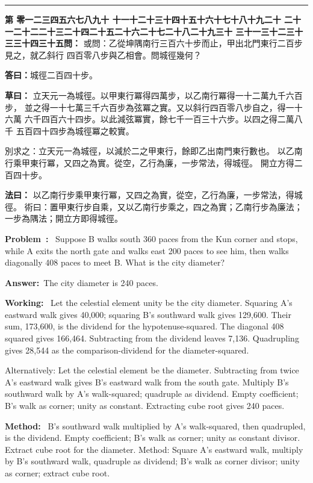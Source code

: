 \documentclass[9pt,a4paper]{article}
\newcounter{probnum}
\newcounter{overallnum}
\newcommand{\chnum}[1]{%
  \ifcase#1 零\or 一\or 二\or 三\or 四\or 五\or 六\or 七\or 八\or 九\or 十\or
    十一\or 十二\or 十三\or 十四\or 十五\or 十六\or 十七\or 十八\or 十九\or 二十\or
    二十一\or 二十二\or 二十三\or 二十四\or 二十五\or 二十六\or 二十七\or 二十八\or 二十九\or 三十\or
    三十一\or 三十二\or 三十三\or 三十四\or 三十五\fi}
\newcommand{\problem}[1]{\stepcounter{probnum}\stepcounter{overallnum}\par\noindent\textbf{\color{volcolor}第\chnum{\value{probnum}}問：}#1\par\vspace{0.15cm}}
\newcommand{\answer}[1]{\par\noindent\textbf{答曰：}#1\par\vspace{0.15cm}}
\newcommand{\working}[1]{\par\noindent\textbf{草曰：}#1\par\vspace{0.15cm}}
\newcommand{\method}[1]{\par\noindent\textbf{法曰：}#1\par\vspace{0.25cm}}
\newcommand{\eproblem}[1]{\par\noindent\textbf{\color{volcolor}Problem~\theoverallnum:}~#1\par\vspace{0.15cm}}
\newcommand{\eanswer}[1]{\par\noindent\textbf{Answer:}~#1\par\vspace{0.15cm}}
\newcommand{\eworking}[1]{\par\noindent\textbf{Working:}~#1\par\vspace{0.15cm}}
\newcommand{\emethod}[1]{\par\noindent\textbf{Method:}~#1\par\vspace{0.25cm}}
\begin{document}
\vspace{0.15cm}
\noindent\rule{\textwidth}{0.2pt}
\vspace{0.15cm}

\noindent\begin{minipage}[t]{0.48\textwidth}
\problem{
或問：乙從坤隅南行三百六十步而止，甲出北門東行二百步見之，就乙斜行
四百零八步與乙相會。問城徑幾何？
}

\answer{城徑二百四十步。}

\working{
立天元一為城徑。以甲東行冪得四萬步，以乙南行冪得一十二萬九千六百步，
並之得一十七萬三千六百步為弦冪之實。又以斜行四百零八步自之，得一十六萬
六千四百六十四步。以此減弦冪實，餘七千一百三十六步。以四之得二萬八千
五百四十四步為城徑冪之較實。

別求之：立天元一為城徑，以減於二之甲東行，餘即乙出南門東行數也。
以乙南行乘甲東行冪，又四之為實。從空，乙行為廉，一步常法，得城徑。
開立方得二百四十步。
}

\method{
以乙南行步乘甲東行冪，又四之為實，從空，乙行為廉，一步常法，得城徑。
術曰：置甲東行步自乘，又以乙南行步乘之，四之為實；乙南行步為廉法；
一步為隅法；開立方即得城徑。
}
\end{minipage}%
\hfill%
\begin{minipage}[t]{0.50\textwidth}
\eproblem{
Suppose B walks south 360 paces from the Kun corner and stops, while A exits
the north gate and walks east 200 paces to see him, then walks diagonally
408 paces to meet B. What is the city diameter?
}

\eanswer{The city diameter is 240 paces.}

\eworking{
Let the celestial element unity be the city diameter. Squaring A's eastward
walk gives 40,000; squaring B's southward walk gives 129,600. Their sum,
173,600, is the dividend for the hypotenuse-squared. The diagonal 408
squared gives 166,464. Subtracting from the dividend leaves 7,136.
Quadrupling gives 28,544 as the comparison-dividend for the diameter-squared.

Alternatively: Let the celestial element be the diameter. Subtracting from
twice A's eastward walk gives B's eastward walk from the south gate.
Multiply B's southward walk by A's walk-squared; quadruple as dividend.
Empty coefficient; B's walk as corner; unity as constant. Extracting cube
root gives 240 paces.
}

\emethod{
B's southward walk multiplied by A's walk-squared, then quadrupled, is the
dividend. Empty coefficient; B's walk as corner; unity as constant divisor.
Extract cube root for the diameter. Method: Square A's eastward walk,
multiply by B's southward walk, quadruple as dividend; B's walk as corner
divisor; unity as corner; extract cube root.
}
\end{minipage}
\vspace{0.15cm}
\end{document}
